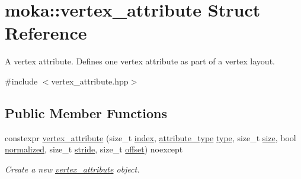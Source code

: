 \hypertarget{structmoka_1_1vertex__attribute}{}\section{moka\+::vertex\+\_\+attribute Struct Reference}
\label{structmoka_1_1vertex__attribute}


A vertex attribute. Defines one vertex attribute as part of a vertex layout.  




{\ttfamily \#include $<$vertex\+\_\+attribute.\+hpp$>$}

\subsection*{Public Member Functions}
\begin{DoxyCompactItemize}
\item 
constexpr \mbox{\hyperlink{structmoka_1_1vertex__attribute_aa03afd5611da669788f8a779587708c2}{vertex\+\_\+attribute}} (size\+\_\+t \mbox{\hyperlink{structmoka_1_1vertex__attribute_aabe27b67bd411d2845eae8d096d6547c}{index}}, \mbox{\hyperlink{namespacemoka_a1fe222f346eb65977e1069323023faa5}{attribute\+\_\+type}} \mbox{\hyperlink{structmoka_1_1vertex__attribute_aa8607ca1afa2836266900168844b6034}{type}}, size\+\_\+t \mbox{\hyperlink{structmoka_1_1vertex__attribute_a12e35fefbda322f7630d6366620ec6e5}{size}}, bool \mbox{\hyperlink{structmoka_1_1vertex__attribute_ab9bafa137212fbb874ac113f29297c8e}{normalized}}, size\+\_\+t \mbox{\hyperlink{structmoka_1_1vertex__attribute_ac14a60d2a9728b757d1b0f0bd09cbaa8}{stride}}, size\+\_\+t \mbox{\hyperlink{structmoka_1_1vertex__attribute_a373fa56e1d1739964eb12c809a80f358}{offset}}) noexcept
\begin{DoxyCompactList}\small\item\em Create a new \mbox{\hyperlink{structmoka_1_1vertex__attribute}{vertex\+\_\+attribute}} object. \end{DoxyCompactList}\end{DoxyCompactItemize}

